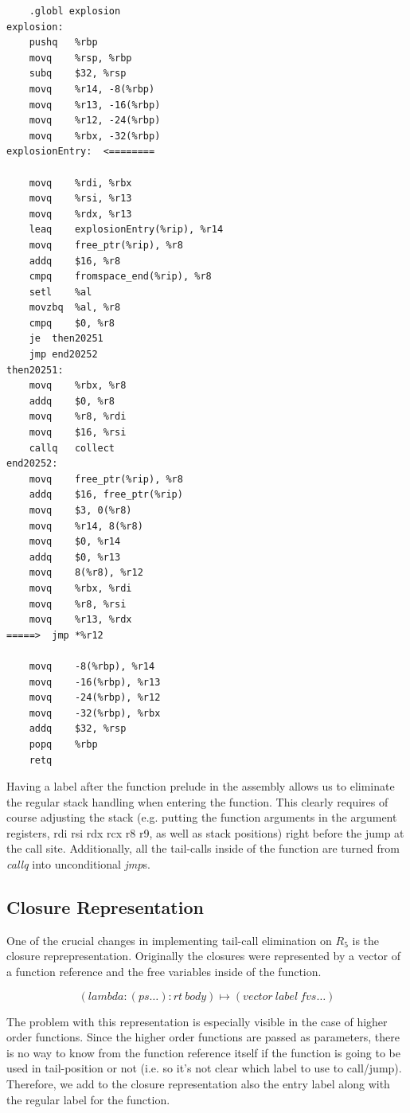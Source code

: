 \documentclass[12pt]{article}
\begin{document}
\begin{multicols}{2}
\begin{verbatim}
	.globl explosion
explosion:
	pushq	%rbp
	movq	%rsp, %rbp
	subq	$32, %rsp
	movq	%r14, -8(%rbp)
	movq	%r13, -16(%rbp)
	movq	%r12, -24(%rbp)
	movq	%rbx, -32(%rbp)
explosionEntry:  <========

	movq	%rdi, %rbx
	movq	%rsi, %r13
	movq	%rdx, %r13
	leaq	explosionEntry(%rip), %r14
	movq	free_ptr(%rip), %r8
	addq	$16, %r8
	cmpq	fromspace_end(%rip), %r8
	setl	%al
	movzbq	%al, %r8
	cmpq	$0, %r8
	je	then20251
	jmp	end20252
then20251:
	movq	%rbx, %r8
	addq	$0, %r8
	movq	%r8, %rdi
	movq	$16, %rsi
	callq	collect
end20252:
	movq	free_ptr(%rip), %r8
	addq	$16, free_ptr(%rip)
	movq	$3, 0(%r8)
	movq	%r14, 8(%r8)
	movq	$0, %r14
	addq	$0, %r13
	movq	8(%r8), %r12
	movq	%rbx, %rdi
	movq	%r8, %rsi
	movq	%r13, %rdx
=====>  jmp	*%r12

	movq	-8(%rbp), %r14
	movq	-16(%rbp), %r13
	movq	-24(%rbp), %r12
	movq	-32(%rbp), %rbx
	addq	$32, %rsp
	popq	%rbp
	retq	
\end{verbatim}
\end{multicols}

Having a label after the function prelude in the assembly allows us to
eliminate the regular stack handling when entering the function. This
clearly requires of course adjusting the stack (e.g. putting the
function arguments in the argument registers, rdi rsi rdx rcx r8 r9,
as well as stack positions) right before the jump at the call
site. Additionally, all the tail-calls inside of the function are
turned from \emph{callq} into unconditional \emph{jmp}s.

\subsection{Closure Representation}

One of the crucial changes in implementing tail-call elimination on
$R_5$ is the closure reprepresentation. Originally the closures were
represented by a vector of a function reference and the free variables
inside of the function.

\begin{equation*}
(lambda: (ps \ldots) : rt\ body) \mapsto (vector\ label\ fvs \ldots)
\end{equation*}

The problem with this representation is especially visible in the case
of higher order functions. Since the higher order functions are passed
as parameters, there is no way to know from the function reference
itself if the function is going to be used in tail-position or not
(i.e. so it's not clear which label to use to call/jump). Therefore,
we add to the closure representation also the entry label along with
the regular label for the function.
\end{document}
